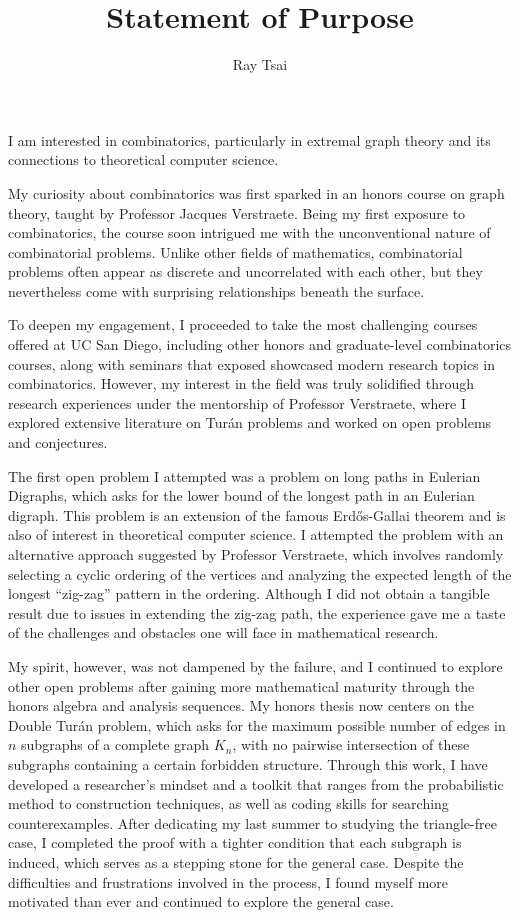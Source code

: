 \documentclass[12pt]{article}
\title{Statement of Purpose}
\author{Ray Tsai}
\date{}
\begin{document}
\maketitle

\vspace{-0.25in}

I am interested in combinatorics, particularly in extremal graph theory and its connections to
theoretical computer science. 

My curiosity about combinatorics was first sparked in an honors course on graph theory, taught by
Professor Jacques Verstraete. Being my first exposure to combinatorics, the course soon intrigued me
with the unconventional nature of combinatorial problems. Unlike other fields of mathematics,
combinatorial problems often appear as discrete and uncorrelated with each other, but they
nevertheless come with surprising relationships beneath the surface.

To deepen my engagement, I proceeded to take the most challenging courses offered at UC San Diego,
including other honors and graduate-level combinatorics courses, along with seminars that exposed
showcased modern research topics in combinatorics. However, my interest in the field was truly
solidified through research experiences under the mentorship of Professor Verstraete, where I
explored extensive literature on Turán problems and worked on open problems and conjectures. 

The first open problem I attempted was a problem on long paths in Eulerian Digraphs, which asks
for the lower bound of the longest path in an Eulerian digraph. This problem is an extension of the
famous Erdős-Gallai theorem and is also of interest in theoretical computer science. I attempted the
problem with an alternative approach suggested by Professor Verstraete, which involves randomly
selecting a cyclic ordering of the vertices and analyzing the expected length of the longest
``zig-zag'' pattern in the ordering. Although I did not obtain a tangible result due to issues in
extending the zig-zag path, the experience gave me a taste of the challenges and obstacles one will
face in mathematical research.

My spirit, however, was not dampened by the failure, and I continued to explore other open problems
after gaining more mathematical maturity through the honors algebra and analysis sequences. My
honors thesis now centers on the Double Turán problem, which asks for the maximum possible number of
edges in $n$ subgraphs of a complete graph $K_n$, with no pairwise intersection of these subgraphs
containing a certain forbidden structure. Through this work, I have developed a researcher's mindset
and a toolkit that ranges from the probabilistic method to construction techniques, as well as
coding skills for searching counterexamples. After dedicating my last summer to studying the
triangle-free case, I completed the proof with a tighter condition that each subgraph is induced,
which serves as a stepping stone for the general case. Despite the difficulties and frustrations
involved in the process, I found myself more motivated than ever and continued to explore the general
case. 
\end{document}
